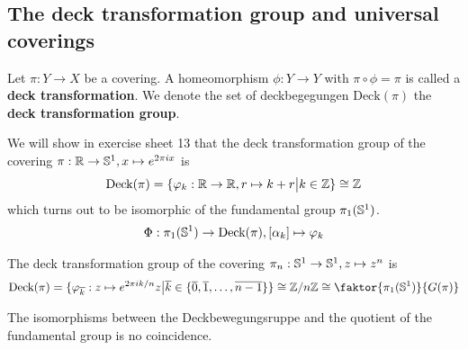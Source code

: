 \subsection{The deck transformation group and universal coverings}

\begin{dfn}[]
Let $\pi:Y \to X$ be a covering.
A homeomorphism $\phi: Y \to  Y$ with $\pi \circ \phi = \pi$ is called a \textbf{deck transformation}.
We denote the set of deckbegegungen $\text{Deck}(\pi)$ the \textbf{deck transformation group}.
\end{dfn}

\begin{ex}[]

We will show in exercise sheet 13 that the deck transformation group of the covering $\pi: \mathbb{R} \to \mathbb{S}^{1}, x \mapsto  e^{2 \pi i x}$ is
\begin{align*}
  \text{Deck}(\pi) = \{\varphi_k : \mathbb{R} \to  \mathbb{R}, r \mapsto  k + r \big\vert k \in \mathbb{Z}\} \cong \mathbb{Z}
\end{align*}
which turns out to be isomorphic of the fundamental group $\pi_1(\mathbb{S}^{1})$.
\begin{align*}
  \Phi: \pi_1(\mathbb{S}^{1}) \to  \text{Deck}(\pi), [\alpha_k] \mapsto \varphi_k
\end{align*}
\end{ex}

\begin{ex}[]
The deck transformation group of the covering $\pi_n : \mathbb{S}^{1} \to \mathbb{S}^{1}, z \mapsto  z^{n}$ is
\begin{align*}
  \text{Deck}(\pi) = \{\phi_{\overline{k}}: z \mapsto  e^{2 \pi i k/n}z \big\vert \overline{k} \in \{\overline{0},\overline{1},\ldots,\overline{n-1}\}\}\iso \Z/n\Z \iso \faktor{\pi_1(\IS^{1})}{G(\pi)}
\end{align*}
\end{ex}

The isomorphisms between the Deckbewegungsruppe and the quotient of the fundamental group is no coincidence.


